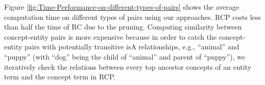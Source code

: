 Figure \ref{fig:Time-Performance-on-different-types-of-pairs} shows
the average computation time on different types of pairs
using our approaches.
RCP costs less than half the time of RC due to the pruning.
Computing similarity between
concept-entity pairs is more expensive
because in order to catch the concept-entity pairs
with potentially transitive isA relationships, e.g., ``animal'' and
``puppy'' (with ``dog'' being the child of ``animal'' and parent
of ``puppy''), we iteratively check the relations between
every top ancestor concepts of an entity term and
the concept term in RCP. %


